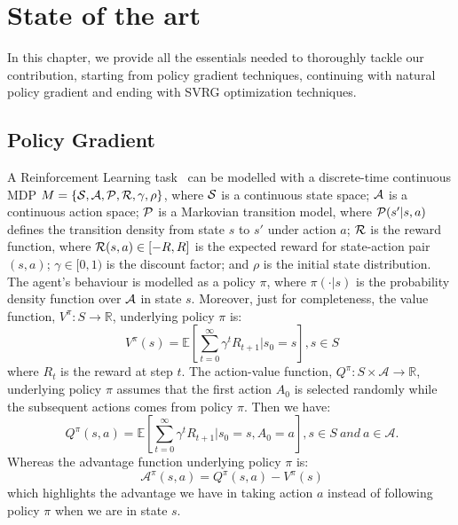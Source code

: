 \chapter{State of the art}\label{chap:art}

\vspace{-0.05in}
In this chapter, we provide all the essentials needed to thoroughly tackle our contribution, starting from policy gradient techniques, continuing with natural policy gradient and ending with \acs{SVRG} optimization techniques.
\vspace{-0.05in}

\section{Policy Gradient}\label{sec:PolicyGradient}
\vspace{-0.05in}
A Reinforcement Learning task~\citep{sutton1998reinforcement} can be modelled with a discrete-time continuous \acs{MDP} $M = \{\mathcal{S},\mathcal{A},\mathcal{P},\mathcal{R},\gamma,\rho\}$, where $\mathcal{S}$ is a continuous state space; $\mathcal{A}$ is a continuous action space; $\mathcal{P}$ is a Markovian transition model, where $\mathcal{P}(s'|s,a)$ defines the transition density from state $s$ to $s'$ under action $a$; $\mathcal{R}$ is the reward function, where $\mathcal{R}(s,a) \in [-R,R]$ is the expected reward for state-action pair $(s,a)$;
$\gamma\in[0,1)$ is the discount factor; and $\rho$ is the initial state distribution.
The agent's behaviour is modelled as a policy $\pi$, where $\pi(\cdot|s)$ is the probability density function over $\mathcal{A}$ in state $s$. Moreover, just for completeness, the value function, $V^{\pi}:S\rightarrow \mathbb{R}$, underlying policy $\pi$ is:
\[
\ V^{\pi}(s)=\mathbb{E}\left[\sum_{t=0}^{\infty}\gamma^tR_{t+1}\bigg|s_0=s\right], s\in S
\]
where $R_t$ is the reward at step $t$.\newline
The action-value function, $Q^{\pi}:S\times\mathcal{A}\rightarrow\mathbb{R}$, underlying policy $\pi$ assumes that the first action $A_0$ is selected randomly while the subsequent actions comes from policy $\pi$. Then we have:
\[
\ Q^{\pi}(s,a)=\mathbb{E}\left[\sum_{t=0}^{\infty}\gamma^tR_{t+1}\bigg| s_0=s,A_0=a\right], s\in S ~ and ~ a \in \mathcal{A}.
\]
Whereas the advantage function underlying policy $\pi$ is:
\[
\ \mathcal{A}^{\pi}(s,a)=Q^{\pi}(s,a)-V^{\pi}(s)
\]
which highlights the advantage we have in taking action $a$ instead of following policy $\pi$ when we are in state $s$.\newline
